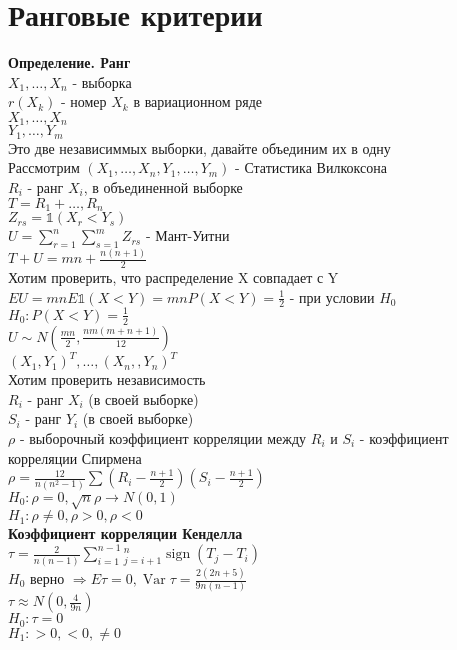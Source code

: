 \documentclass{article}
\newcommand\0{\mathbb{0}}
\DeclareMathOperator{\sign}{sign}
\DeclareMathOperator{\Var}{Var}
\newcommand\1{\mathbb{1}}
\renewcommand{\bf}{\textbf}
\newcommand{\Rto}{\Rightarrow}
\begin{document}
\section{Ранговые критерии}
\textbf{Определение. Ранг}\\
$X_1, \dots, X_n$ - выборка\\
$r(X_k)$ - номер $X_k$ в вариационном ряде\\
$X_1, \dots, X_n$\\
$Y_1, \dots, Y_m$\\
Это две независиммых выборки, давайте объединим их в одну\\
Рассмотрим $(X_1, \dots, X_n, Y_1, \dots, Y_m)$ - Статистика Вилкоксона\\
$R_i$ - ранг $X_i$, в объединенной выборке\\
$T = R_1 + \dots, R_n$\\
$Z_{rs} = \mathbb{1}(X_r < Y_s)$\\
$U = \displaystyle\sum_{r = 1}^n \displaystyle\sum_{s = 1}^m Z_{rs}$ - Мант-Уитни\\
$T + U = mn + \frac{n(n + 1)}{2}$\\
Хотим проверить, что распределение X совпадает с Y\\
$EU = mn E \mathbb{1}(X < Y) = mnP(X < Y) = \frac{1}{2}$ - при условии $H_0$\\
$H_0: P(X < Y) = \frac{1}{2}$\\
$U \sim N(\frac{mn}{2}, \frac{nm(m + n + 1)}{12})$\\
$(X_1, Y_1)^T, \dots, (X_n, , Y_n)^T$\\
Хотим проверить независимость\\
$R_i$ - ранг $X_i$ (в своей выборке)\\
$S_i$ - ранг $Y_i$ (в своей выборке)\\
$\rho$ - выборочный коэффициент корреляции между $R_i$ и $S_i$ - коэффициент корреляции Спирмена\\
$\rho = \frac{12}{n(n^2 - 1)} \displaystyle\sum (R_i - \frac{n + 1}{2})(S_i - \frac{n + 1}{2})$\\
$H_0: \rho = 0, \sqrt{n}\rho \to N(0, 1)$\\
$H_1: \rho \neq 0, \rho > 0, \rho < 0$\\
\bf{Коэффициент корреляции Кенделла}\\
$\tau = \frac{2}{n(n - 1)} \displaystyle\sum_{i = 1}^{n - 1}\displaystyle_{j = i + 1}^{n}\sign(T_j - T_i)$\\
$H_0$ верно $\Rto E\tau = 0, \Var \tau = \frac{2(2n + 5)}{9n(n - 1)}$\\
$\tau \approx N(0, \frac{4}{9n})$\\
$H_0: \tau = 0$\\
$H_1: > 0, < 0, \neq 0$\\
\end{document}
